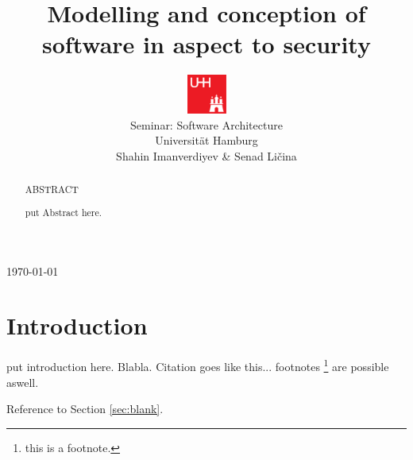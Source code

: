 \documentclass{acmtog} %
\begin{document}

\title{Modelling and conception of software in aspect to security} %

\author{
\parbox{4.2em}{\includegraphics[width=3.5em]{img/uhh}}%
\parbox{\textwidth}{
Seminar: Software Architecture \\
Universität Hamburg \\
Shahin Imanverdiyev \& Senad Ličina
}
}




\maketitle

\begin{bottomstuff}
\today
\end{bottomstuff}

\begin{abstract}
\begin{center}
ABSTRACT
\end{center}
put Abstract here.
\end{abstract}

\section{Introduction}

put introduction here. 
Blabla.
Citation goes like this... \cite{SHRB11}
footnotes \footnote{this is a footnote.} are possible aswell.

Reference to Section \ref{sec:blank}.
\end{document}

